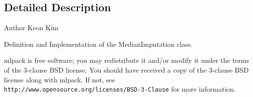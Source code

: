 \subsection{Detailed Description}
\begin{DoxyAuthor}{Author}
Keon Kim
\end{DoxyAuthor}
Definition and Implementation of the Median\+Imputation class.

mlpack is free software; you may redistribute it and/or modify it under the terms of the 3-\/clause B\+SD license. You should have received a copy of the 3-\/clause B\+SD license along with mlpack. If not, see {\tt http\+://www.\+opensource.\+org/licenses/\+B\+S\+D-\/3-\/\+Clause} for more information. 